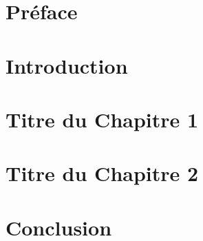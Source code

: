 \documentclass[12pt,a4paper]{report}
\begin{document}




\chapter*{Préface}

\tableofcontents
\newpage

\chapter{Introduction}
 

\chapter{Titre du Chapitre 1}
% 


\chapter{Titre du Chapitre 2}
% 

\chapter{Conclusion}


% 
% 



\end{document}
